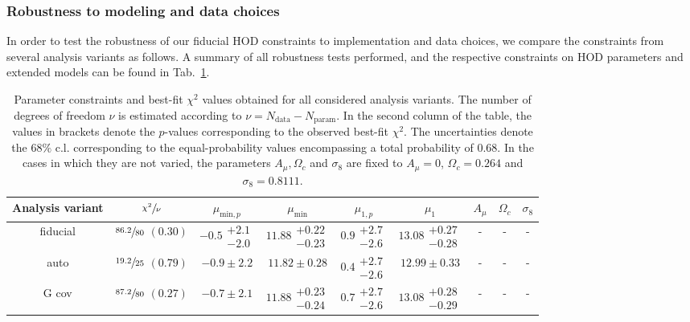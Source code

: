 \documentclass[a4paper,11pt]{article}
\newcommand\Tstrut{\rule{0pt}{3ex}}
\begin{document}
    \subsubsection{Robustness to modeling and data choices}
      In order to test the robustness of our fiducial HOD constraints to implementation and data choices, we compare the constraints from several analysis variants as follows. A summary of all robustness tests performed, and the respective constraints on HOD parameters and extended models can be found in Tab.~\ref{tab:constraints_robustness}.

      \begin{table}
        \caption{Parameter constraints and best-fit $\chi^{2}$ values obtained for all considered analysis variants. The number of degrees of freedom $\nu$ is estimated according to $\nu = N_{\mathrm{data}}-N_{\mathrm{param}}$. In the second column of the table, the values in brackets denote the $p$-values corresponding to the observed best-fit $\chi^{2}$. The uncertainties denote the $68 \%$ c.l. corresponding to the equal-probability values encompassing a total probability of 0.68. In the cases in which they are not varied, the parameters $A_{\mu}, \Omega_{c}$ and $\sigma_{8}$ are fixed to $A_{\mu}=0$, $\Omega_{c}=0.264$ and $\sigma_{8} = 0.8111$.} \label{tab:constraints_robustness}
        \begin{center}
          \begin{tabular}{ccccccccc}
            \hline\hline 
            Analysis variant & $\sfrac{\chi^{2}}{\nu}$ & $\mu_{\mathrm{min}, p}$ & $\mu_{\mathrm{min}}$ & $\mu_{1, p}$ & $\mu_{1}$ & $A_{\mu}$ & $\Omega_{c}$ & $\sigma_{8}$ \\ \hline \Tstrut       
            fiducial & $\sfrac{86.2}{80}$ $(0.30)$ & $-0.5\substack{+2.1 \\ -2.0}$ & $11.88\substack{+0.22 \\ -0.23}$ & $0.9\substack{+2.7 \\ -2.6}$ & $13.08\substack{+0.27 \\ -0.28}$ & - & - & - \\
            auto & $\sfrac{19.2}{25}$ $(0.79)$ & $-0.9\pm 2.2$ & $11.82 \pm 0.28$ & $0.4\substack{+2.7 \\ -2.6}$ & $12.99 \pm 0.33$  & - & - & - \\
            G cov & $\sfrac{87.2}{80}$ $(0.27)$ & $-0.7\pm 2.1$ & $11.88\substack{+0.23 \\ -0.24}$ & $0.7\substack{+2.7 \\ -2.6}$ & $13.08\substack{+0.28 \\ -0.29}$ & - & - & - \\

\end{tabular}
\end{center}
\end{table}
\end{document}
